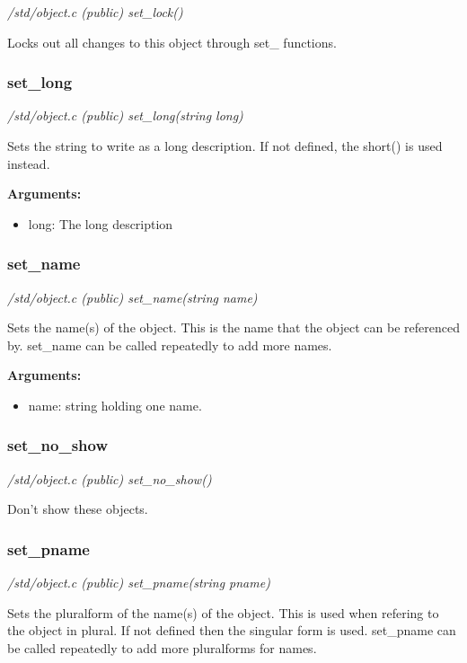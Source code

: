 {\em /std/object.c (public) set\_lock()}

Locks out all changes to this object through set\_ functions.


\subsubsection{set\_long}

{\em /std/object.c (public) set\_long(string long)}

Sets the string to write as a long description.
If not defined, the short() is used instead.

{\bf Arguments:}
\begin{itemize}
\item      long: The long description
\end{itemize}


\subsubsection{set\_name}

{\em /std/object.c (public) set\_name(string name)}

Sets the name(s) of the object. This is the name that
the object can be referenced by. set\_name can be called
repeatedly to add more names.

{\bf Arguments:}
\begin{itemize}
\item     name: string holding one name.
\end{itemize}


\subsubsection{set\_no\_show}

{\em /std/object.c (public) set\_no\_show()}

Don't show these objects.


\subsubsection{set\_pname}

{\em /std/object.c (public) set\_pname(string pname)}

Sets the pluralform of the name(s) of the object. This is
used when refering to the object in plural. If not defined
then the singular form is used. set\_pname can be called
repeatedly to add more pluralforms for names.

